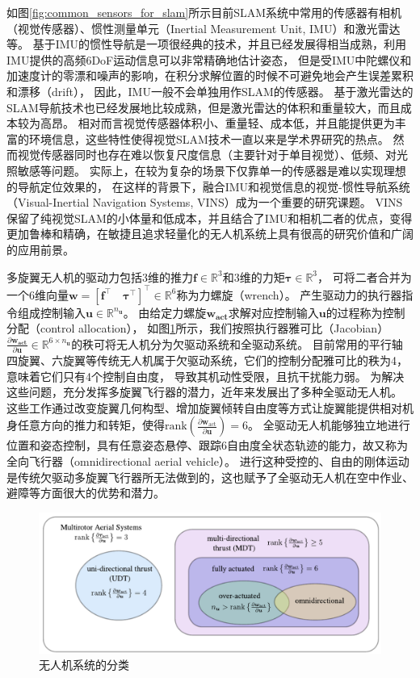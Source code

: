 如图\ref{fig:common_sensors_for_slam}所示目前SLAM系统中常用的传感器有相机（视觉传感器）、惯性测量单元（Inertial Measurement Unit, IMU）和激光雷达等。
基于IMU的惯性导航是一项很经典的技术，并且已经发展得相当成熟，利用IMU提供的高频6DoF运动信息可以非常精确地估计姿态，
但是受IMU中陀螺仪和加速度计的零漂和噪声的影响，在积分求解位置的时候不可避免地会产生误差累积和漂移（drift），
因此，IMU一般不会单独用作SLAM的传感器。
基于激光雷达的SLAM导航技术也已经发展地比较成熟，但是激光雷达的体积和重量较大，而且成本较为高昂。
相对而言视觉传感器体积小、重量轻、成本低，并且能提供更为丰富的环境信息，这些特性使得视觉SLAM技术一直以来是学术界研究的热点。
然而视觉传感器同时也存在难以恢复尺度信息（主要针对于单目视觉）、低频、对光照敏感等问题。
实际上，在较为复杂的场景下仅靠单一的传感器是难以实现理想的导航定位效果的，
在这样的背景下，融合IMU和视觉信息的视觉-惯性导航系统（Visual-Inertial Navigation Systems, VINS）成为一个重要的研究课题。
VINS保留了纯视觉SLAM的小体量和低成本，并且结合了IMU和相机二者的优点，变得更加鲁棒和精确，在敏捷且追求轻量化的无人机系统上具有很高的研究价值和广阔的应用前景。

多旋翼无人机的驱动力包括3维的推力$\bm{f} \in \mathbb{R}^3$和3维的力矩$\bm{\tau} \in \mathbb{R}^3$，
可将二者合并为一个6维向量$\bm{w} = \left[\bm{f}^\top \quad \bm{\tau}^\top\right]^\top \in \mathbb{R}^6$称为力螺旋（wrench）。
产生驱动力的执行器指令组成控制输入$\bm{u} \in \mathbb{R}^{n_{\bm{u}}}$。
由给定力螺旋$\bm{w_\text{act}}$求解对应控制输入$\bm{u}$的过程称为控制分配（control allocation），
如图\ref{fig:uav_classification}所示，我们按照执行器雅可比（Jacobian）$\frac{\partial \bm{w_\text{act}}}{\partial \bm{u}} \in \mathbb{R}^{6 \times n_{\bm{u}}}$的秩可将无人机分为欠驱动系统和全驱动系统\cite{bodie2022omnidirectional}。
目前常用的平行轴四旋翼、六旋翼等传统无人机属于欠驱动系统，它们的控制分配雅可比的秩为4，意味着它们只有4个控制自由度，
导致其机动性受限，且抗干扰能力弱。
为解决这些问题，充分发挥多旋翼飞行器的潜力，近年来发展出了多种全驱动无人机。
这些工作通过改变旋翼几何构型、增加旋翼倾转自由度等方式让旋翼能提供相对机身任意方向的推力和转矩，使得$\text{rank}(\frac{\partial \bm{w}_\text{act}}{\partial \bm{u}}) = 6$。
全驱动无人机能够独立地进行位置和姿态控制，具有任意姿态悬停、跟踪6自由度全状态轨迹的能力，故又称为全向飞行器（omnidirectional aerial vehicle）。
进行这种受控的、自由的刚体运动是传统欠驱动多旋翼飞行器所无法做到的，这也赋予了全驱动无人机在空中作业、避障等方面很大的优势和潜力。

\begin{figure}[htbp]
    \centering
    \includegraphics[width = \textwidth]{figures/uav_classification.png}
    \caption{无人机系统的分类\cite{bodie2022omnidirectional}}
    \label{fig:uav_classification}
\end{figure}

